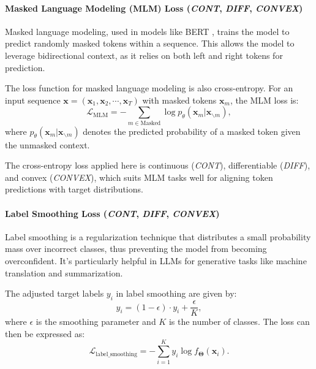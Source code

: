 \documentclass[sn-mathphys-num]{sn-jnl}%
\newcommand \cont{\textit{CONT}}
\newcommand \diff{\textit{DIFF}}
\newcommand \conv{\textit{CONVEX}}
\renewcommand\vec{\mathbf}
\begin{document}
\paragraph{Masked Language Modeling (MLM) Loss (\cont, \diff, \conv)}\label{subsubsec-transformer_mlm_loss}
Masked language modeling, used in models like BERT \cite{devlin2018bert}, trains the model to predict randomly masked tokens within a sequence. This allows the model to leverage bidirectional context, as it relies on both left and right tokens for prediction.

The loss function for masked language modeling is also cross-entropy. For an input sequence $\mathbf{x} = (\mathbf{x}_1, \mathbf{x}_2, \cdots, \mathbf{x}_T)$ with masked tokens \( \mathbf{x}_m \), the MLM loss is:
\begin{equation}
    \mathcal{L}_{\text{MLM}} = - \sum_{m \in \text{Masked}} \log p_\theta(\mathbf{x}_m | \mathbf{x}_{\backslash m}),
\end{equation}
where \( p_\theta(\mathbf{x}_m | \mathbf{x}_{\backslash m}) \) denotes the predicted probability of a masked token given the unmasked context.

The cross-entropy loss applied here is continuous (\cont), differentiable (\diff), and convex (\conv), which suits MLM tasks well for aligning token predictions with target distributions. 

\paragraph{Label Smoothing Loss (\cont, \diff, \conv)}\label{subsubsec-transformer_label_smoothing_loss}
Label smoothing \cite{vaswani2017attention} is a regularization technique that distributes a small probability mass over incorrect classes, thus preventing the model from becoming overconfident. It’s particularly helpful in LLMs for generative tasks like machine translation and summarization.

The adjusted target labels \( y_i \) in label smoothing are given by:
\begin{equation}
    y_i = (1 - \epsilon) \cdot y_i + \frac{\epsilon}{K},
\end{equation}
where \( \epsilon \) is the smoothing parameter and \( K \) is the number of classes. The loss can then be expressed as:
\begin{equation}
    \mathcal{L}_{\text{label\_smoothing}} = - \sum_{i=1}^{K} y_i \log f_{\vec{\Theta}}(\vec{x}_i).
\end{equation}
\end{document}
